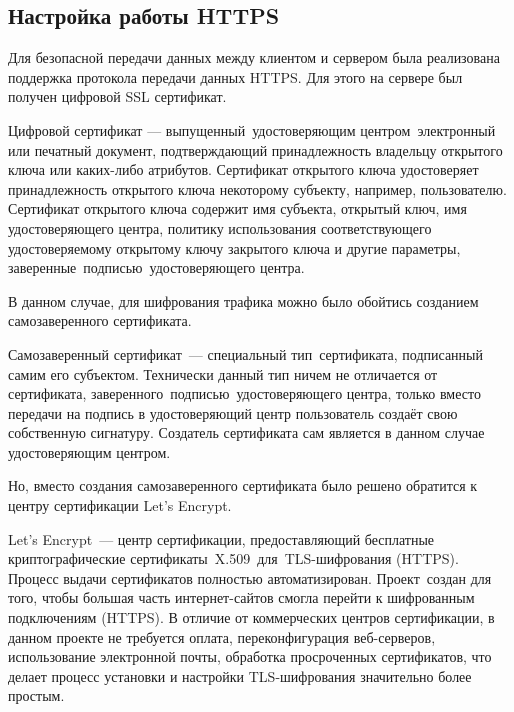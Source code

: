 \clearpage
\subsection{Настройка работы HTTPS}
Для безопасной передачи данных между клиентом и сервером была реализована
поддержка протокола передачи данных HTTPS. Для этого на сервере был получен цифровой SSL сертификат.
\begin{definition}
    Цифровой сертификат --- выпущенный удостоверяющим центром электронный или печатный документ,
    подтверждающий принадлежность владельцу открытого ключа или каких-либо атрибутов.
    Сертификат открытого ключа удостоверяет принадлежность открытого ключа некоторому субъекту, например, пользователю.
    Сертификат открытого ключа содержит имя субъекта, открытый ключ, имя удостоверяющего центра,
    политику использования соответствующего удостоверяемому открытому ключу закрытого ключа и другие параметры, заверенные подписью удостоверяющего центра.
\end{definition}

В данном случае, для шифрования трафика можно было обойтись созданием самозаверенного сертификата.
\begin{definition}
    Самозаверенный сертификат --- специальный тип сертификата, подписанный самим его субъектом. Технически данный тип ничем не отличается от сертификата,
    заверенного подписью удостоверяющего центра, только вместо передачи на подпись в удостоверяющий центр пользователь создаёт свою собственную сигнатуру.
    Создатель сертификата сам является в данном случае удостоверяющим центром.
\end{definition}

Но, вместо создания самозаверенного сертификата было решено обратится к центру сертификации Let’s Encrypt.
\begin{definition}
    Let’s Encrypt --- центр сертификации, предоставляющий бесплатные криптографические сертификаты X.509 для TLS-шифрования (HTTPS).
    Процесс выдачи сертификатов полностью автоматизирован. Проект создан для того,
    чтобы большая часть интернет-сайтов смогла перейти к шифрованным подключениям (HTTPS). В отличие от коммерческих центров сертификации,
    в данном проекте не требуется оплата, переконфигурация веб-серверов, использование электронной почты,
    обработка просроченных сертификатов, что делает процесс установки и настройки TLS-шифрования значительно более простым.
\end{definition}


\clearpage
